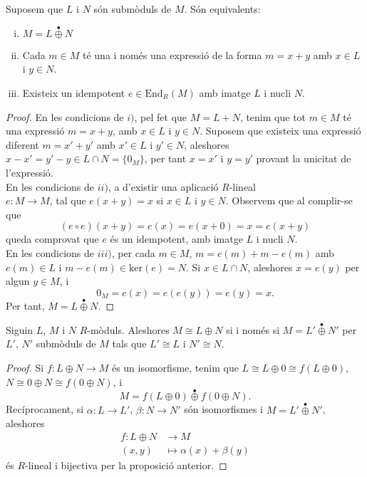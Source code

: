 \begin{prop} \label{primer}
Suposem que $L$ i $N$ són submòduls de $M$. Són equivalents:
\begin{enumerate}[i)]
\item $M=L\overset{\bullet}{\oplus} N$
\item Cada $m\in M$ té una i només una expressió de la forma $m=x+y$ amb $x\in L$ i $y\in N$.
\item Existeix un idempotent $e\in \text{End}_R(M)$ amb imatge $L$ i nucli $N$. 
\end{enumerate}
\label{img+ker=M}
\end{prop}

\begin{proof}
En les condicions de $i)$, pel fet que $M=L+N$, tenim que tot $m\in M$ té una expressió $m=x+y$, amb $x\in L$ i $y\in N$. Suposem que existeix una expressió diferent $m=x'+y'$ amb $x'\in L$ i $y'\in N$, aleshores $x-x'=y'-y\in L \cap N = \{0_M\}$, per tant $x=x'$ i $y=y'$ provant la unicitat de l'expressió. 
\\
\indent En les condicions de $ii)$, a d'existir una aplicació $R$-lineal \\ $e: M \rightarrow M$, tal que $e(x+y)=x$ si $x\in L$ i $y\in N$. Observem que al complir-se que $$(e\circ e)(x+y)=e(x)=e(x+0)=x=e(x+y)$$ queda comprovat que $e$ és un idempotent, amb imatge $L$ i nucli $N$.
\\
\indent En les condicions de $iii)$, per cada $m\in M$, $m=e(m)+m-e(m)$ amb $e(m)\in L$ i $m-e(m)\in \text{ker}(e)=N$. Si $x\in L\cap N$, aleshores $x=e(y)$ per algun $y\in M$, i $$0_M=e(x)=e(e(y))=e(y)=x.$$ Per tant, $M=L\overset{\bullet}{\oplus}N$.
\end{proof}

\begin{prop}
Siguin $L$, $M$ i $N$ $R$-mòduls. Aleshores $M\cong L \oplus N$ si i només si $M=L' \overset{\bullet}{\oplus} N'$ per $L'$, $N'$ submòduls de $M$ tals que $L'\cong L$ i $N' \cong N$.
\end{prop}

\begin{proof}
Si $f: L \oplus N \rightarrow M$ és un isomorfisme, tenim que $L\cong L \oplus 0 \cong f(L\oplus 0)$, $N\cong 0 \oplus N \cong f(0\oplus N)$, i 
$$
M=f(L\oplus 0)\overset{\bullet}{\oplus} f(0 \oplus N).
$$
Recíprocament, si $\alpha: L \rightarrow L'$, $\beta: N \rightarrow N'$ són isomorfismes i $M=L' \overset{\bullet}{\oplus} N'$, aleshores
\begin{eqnarray*}
        f: L \oplus N& \rightarrow M\\
        (x,y)& \mapsto  \alpha (x)+\beta (y)
\end{eqnarray*}
 és $R$-lineal i bijectiva per la proposició anterior.
\end{proof}
